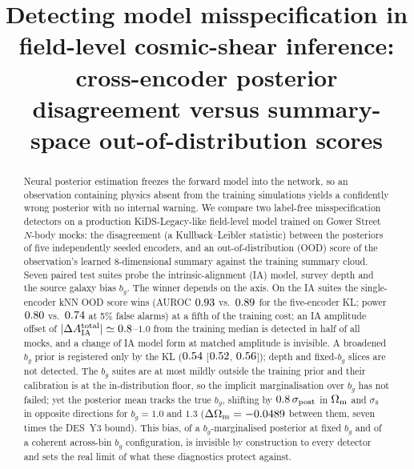 \documentclass[9pt,twocolumn]{extarticle}
\title{\vspace{-1.2em}Detecting model misspecification in field-level cosmic-shear inference:\\
cross-encoder posterior disagreement versus summary-space out-of-distribution scores\vspace{-0.4em}}
\author{}
\date{}
\newcommand{\dAia}{|\Delta A_{\rm IA}^{\rm total}|}
\newcommand{\Om}{\Omega_{\rm m}}
\newcommand{\sig}{\sigma_8}
\newcommand{\bg}{b_g}
\begin{document}
\maketitle
\vspace{-2.2em}
\begin{abstract}
\noindent Neural posterior estimation freezes the forward model into the network, so an observation
containing physics absent from the training simulations yields a confidently wrong posterior with no
internal warning. We compare two label-free misspecification detectors on a production
KiDS-Legacy-like field-level model trained on Gower Street $N$-body mocks: the disagreement (a
Kullback--Leibler statistic) between the posteriors of five independently seeded encoders, and an
out-of-distribution (OOD) score of the observation's learned 8-dimensional summary against the training
summary cloud. Seven paired test suites probe the intrinsic-alignment (IA) model, survey depth and the
source galaxy bias $\bg$. The winner depends on the axis. On the IA suites the single-encoder kNN OOD
score wins (AUROC $0.93$ vs.\ $0.89$ for the five-encoder KL; power $0.80$
vs.\ $0.74$ at 5\% false alarms) at a fifth of the training cost; an IA amplitude offset of
$\dAia\simeq0.8$--$1.0$ from the training median is detected in half of all mocks, and a change of IA
model form at matched amplitude is invisible. A broadened $\bg$ prior is registered only by the KL
($0.54$ [$0.52$, $0.56$]); depth and fixed-$\bg$ slices are not
detected. The $\bg$ suites are at most mildly outside the training prior and their
calibration is at the in-distribution floor, so the implicit marginalisation over $\bg$ has not failed;
yet the posterior mean tracks the true $\bg$, shifting by $0.8\,\sigma_{\rm post}$ in $\Om$ and $\sig$
in opposite directions for $\bg=1.0$ and $1.3$ ($\Delta\Om=\NDthetaOmegaM$ between them, seven times the
DES~Y3 bound). This bias, of a $\bg$-marginalised posterior at fixed $\bg$ and of a coherent across-bin $\bg$
configuration, is invisible by construction to every detector and sets the real limit of what these
diagnostics protect against.
\end{abstract}
\end{document}
